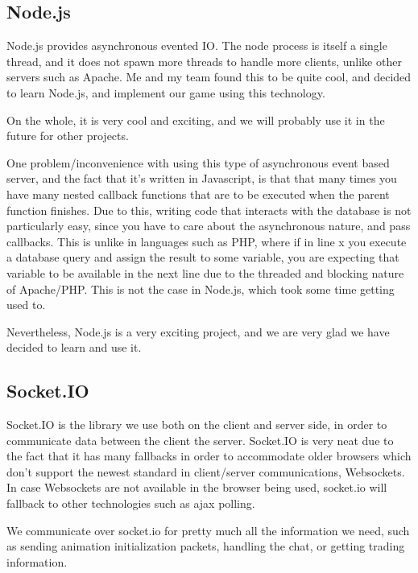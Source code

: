 \documentclass[a4paper,11pt]{article}
\begin{document}
		\subsection{Node.js}
		
			Node.js provides asynchronous evented IO. The node process is itself a single thread, and it does not spawn more threads to handle more clients, unlike other servers such as Apache. Me and my team found this to be quite cool, and decided to learn Node.js, and implement our game using this technology.
			
			On the whole, it is very cool and exciting, and we will probably use it in the future for other projects.
			
			One problem/inconvenience with using this type of asynchronous event based server, and the fact that it's written in Javascript, is that that many times you have many nested callback functions that are to be executed when the parent function finishes. Due to this, writing code that interacts with the database is not particularly easy, since you have to care about the asynchronous nature, and pass callbacks. This is unlike in languages such as PHP, where if in line x you execute a database query and assign the result to some variable, you are expecting that variable to be available in the next line due to the threaded and blocking nature of Apache/PHP. This is not the case in Node.js, which took some time getting used to.
			
			Nevertheless, Node.js is a very exciting project, and we are very glad we have decided to learn and use it.		
		
		\subsection{Socket.IO}
		
			Socket.IO is the library we use both on the client and server side, in order to communicate data between the client the server. Socket.IO is very neat due to the fact that it has many fallbacks in order to accommodate older browsers which don't support the newest standard in client/server communications, Websockets. In case Websockets are not available in the browser being used, socket.io will fallback to other technologies such as ajax polling.
		
			We communicate over socket.io for pretty much all the information we need, such as sending animation initialization packets, handling the chat, or getting trading information.
		
\end{document}
